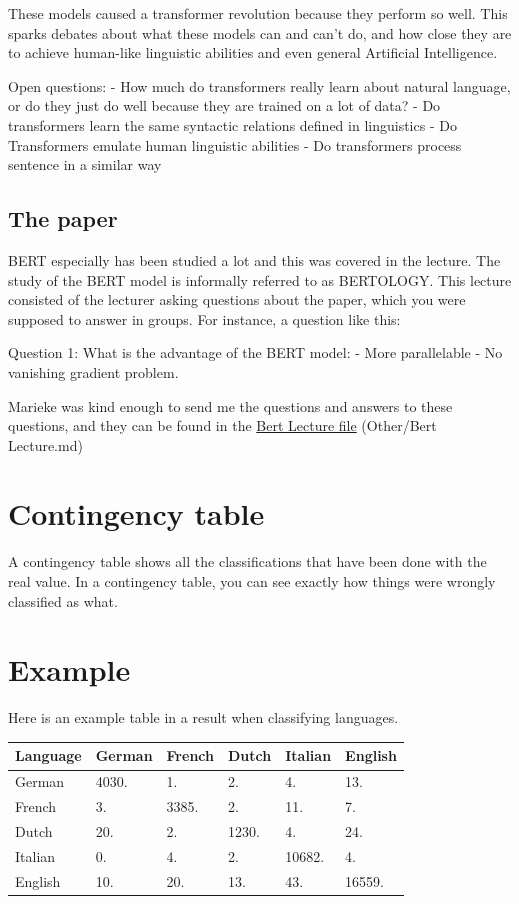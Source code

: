 \documentclass[
  11pt,
  british,
]{article}
\begin{document}
These models caused a transformer revolution because they perform so
well. This sparks debates about what these models can and can't do, and
how close they are to achieve human-like linguistic abilities and even
general Artificial Intelligence.

Open questions: - How much do transformers really learn about natural
language, or do they just do well because they are trained on a lot of
data? - Do transformers learn the same syntactic relations defined in
linguistics - Do Transformers emulate human linguistic abilities - Do
transformers process sentence in a similar way

\hypertarget{the-paper}{%
\subsection{The paper}\label{the-paper}}

BERT especially has been studied a lot and this was covered in the
lecture. The study of the BERT model is informally referred to as
BERTOLOGY. This lecture consisted of the lecturer asking questions about
the paper, which you were supposed to answer in groups. For instance, a
question like this:

Question 1: What is the advantage of the BERT model: - More parallelable
- No vanishing gradient problem.

Marieke was kind enough to send me the questions and answers to these
questions, and they can be found in the
\href{../Other/Bert\%20Lecture.md}{Bert Lecture file} (Other/Bert
Lecture.md)

\hypertarget{contingency-table}{%
\section{Contingency table}\label{contingency-table}}

A contingency table shows all the classifications that have been done
with the real value. In a contingency table, you can see exactly how
things were wrongly classified as what.

\hypertarget{example-5}{%
\section{Example}\label{example-5}}

Here is an example table in a result when classifying languages.

\begin{longtable}[]{@{}llllll@{}}
\toprule
Language & German & French & Dutch & Italian & English \\
\midrule
\endhead
German & 4030. & 1. & 2. & 4. & 13. \\
French & 3. & 3385. & 2. & 11. & 7. \\
Dutch & 20. & 2. & 1230. & 4. & 24. \\
Italian & 0. & 4. & 2. & 10682. & 4. \\
English & 10. & 20. & 13. & 43. & 16559. \\
\bottomrule
\end{longtable}
\end{document}
